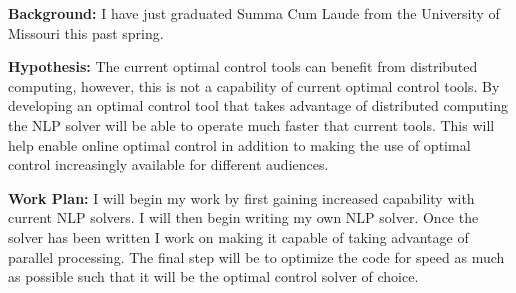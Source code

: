 \documentclass[12pt]{article}
\begin{document}

\textbf{Background:} I have just graduated Summa Cum Laude from the University
of Missouri this past spring.


\bigskip


\textbf{Hypothesis:} The current optimal control tools can benefit from
distributed computing, however, this is not a capability of current optimal
control tools. By developing an optimal control tool that takes advantage of
distributed computing the NLP solver will be able to operate much faster that
current tools. This will help enable online optimal control in addition to
making the use of optimal control increasingly available for different
audiences.

%

\bigskip


\textbf{Work Plan:} I will begin my work by first gaining increased capability
with current NLP solvers. I will then begin writing my own NLP solver. Once the
solver has been written I work on making it capable of taking advantage of
parallel processing.  The final step will be to optimize the code for speed as
much as possible such that it will be the optimal control solver of choice.
\end{document}
